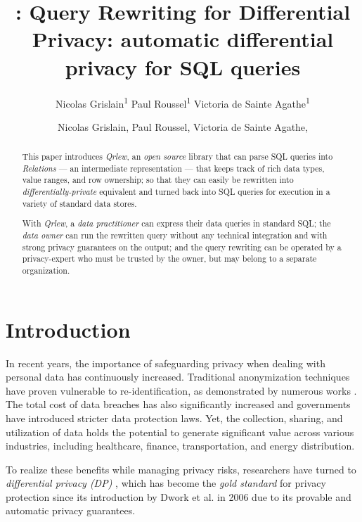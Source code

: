 \documentclass[letterpaper]{article} %
\title{\qrlew: Query Rewriting for Differential Privacy}
\author{
    Nicolas Grislain\textsuperscript{\rm 1}
    Paul Roussel\textsuperscript{\rm 1}
    Victoria de Sainte Agathe\textsuperscript{\rm 1}
}
\title{\qrlew: automatic differential privacy for SQL queries}
\author {
    Nicolas Grislain,
    Paul Roussel,
    Victoria de Sainte Agathe,
}
\newcommand{\qrlew}{\emph{Qrlew}}
\begin{document}
\maketitle

\begin{abstract}
This paper introduces \qrlew{}, an \emph{open source} library that can parse SQL queries into \emph{Relations} --- an intermediate representation --- that keeps track of rich data types, value ranges, and row ownership; so that they can easily be rewritten into \emph{differentially-private} equivalent and turned back into SQL queries for execution in a variety of standard data stores.

With \qrlew{}, a \emph{data practitioner} can express their data queries in standard SQL; the \emph{data owner} can run the rewritten query without any technical integration and with strong privacy guarantees on the output; and the query rewriting can be operated by a privacy-expert who must be trusted by the owner, but may belong to a separate organization.
\end{abstract}

\section{Introduction}

In recent years, the importance of safeguarding privacy when dealing with personal data has continuously increased.
Traditional anonymization techniques have proven vulnerable to re-identification, as demonstrated by numerous works \cite{archie2018s, dwork2017exposed, narayanan2008robust, sweeney2013identifying}.
The total cost of data breaches has also significantly increased \cite{ibm2023cost} and governments have introduced stricter data protection laws.
Yet, the collection, sharing, and utilization of data holds the potential to generate significant value across various industries, including healthcare, finance, transportation, and energy distribution.

To realize these benefits while managing privacy risks, researchers have turned to \emph{differential privacy (DP)} \cite{wood2018differential, dwork2014algorithmic}, which has become the \emph{gold standard} for privacy protection since its introduction by Dwork et al. in 2006 \cite{dwork2006calibrating} due to its provable and automatic privacy guarantees.
\end{document}
